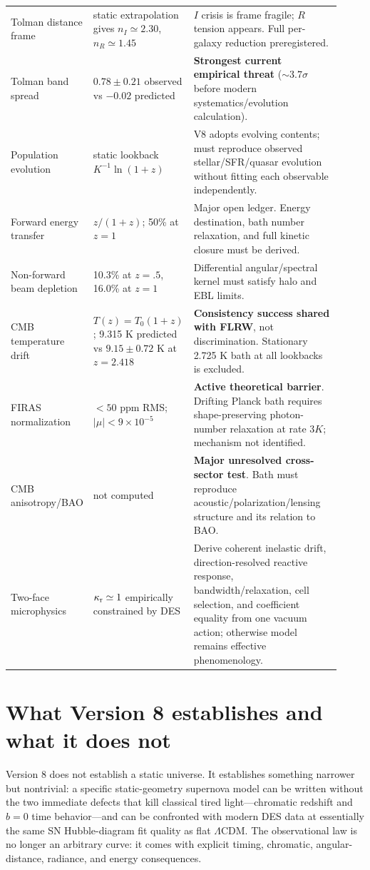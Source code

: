 \documentclass[11pt]{article}
\newcommand{\LCDM}{$\Lambda$CDM}
\newcommand{\kreact}{\kappa_{\rm r}}
\begin{document}
\begin{longtable}{p{0.20\linewidth}p{0.25\linewidth}p{0.47\linewidth}}
Tolman distance frame & static extrapolation gives $n_I\simeq2.30$, $n_R\simeq1.45$ & $I$ crisis is frame fragile; $R$ tension appears. Full per-galaxy reduction preregistered.\\
Tolman band spread & $0.78\pm0.21$ observed vs $-0.02$ predicted & \textbf{Strongest current empirical threat} ($\sim3.7\sigma$ before modern systematics/evolution calculation).\\
Population evolution & static lookback $K^{-1}\ln(1+z)$ & V8 adopts evolving contents; must reproduce observed stellar/SFR/quasar evolution without fitting each observable independently.\\
Forward energy transfer & $z/(1+z)$; 50\% at $z=1$ & Major open ledger. Energy destination, bath number relaxation, and full kinetic closure must be derived.\\
Non-forward beam depletion & 10.3\% at $z=.5$, 16.0\% at $z=1$ & Differential angular/spectral kernel must satisfy halo and EBL limits.\\
CMB temperature drift & $T(z)=T_0(1+z)$; 9.315 K predicted vs $9.15\pm0.72$ K at $z=2.418$ & \textbf{Consistency success shared with FLRW}, not discrimination. Stationary 2.725 K bath at all lookbacks is excluded.\\
FIRAS normalization & $<50$ ppm RMS; $|\mu|<9\times10^{-5}$ & \textbf{Active theoretical barrier}. Drifting Planck bath requires shape-preserving photon-number relaxation at rate $3K$; mechanism not identified.\\
CMB anisotropy/BAO & not computed & \textbf{Major unresolved cross-sector test}. Bath must reproduce acoustic/polarization/lensing structure and its relation to BAO.\\
Two-face microphysics & $\kreact\simeq1$ empirically constrained by DES & Derive coherent inelastic drift, direction-resolved reactive response, bandwidth/relaxation, cell selection, and coefficient equality from one vacuum action; otherwise model remains effective phenomenology.\\
\bottomrule
\end{longtable}
\normalsize

\section{What Version 8 establishes and what it does not}
Version 8 does not establish a static universe. It establishes something narrower but nontrivial: a specific static-geometry supernova model can be written without the two immediate defects that kill classical tired light---chromatic redshift and $b=0$ time behavior---and can be confronted with modern DES data at essentially the same SN Hubble-diagram fit quality as flat \LCDM. The observational law is no longer an arbitrary curve: it comes with explicit timing, chromatic, angular-distance, radiance, and energy consequences.
\end{document}
